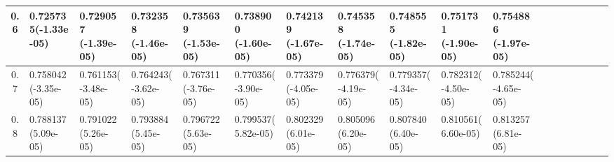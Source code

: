 \documentclass[
	article,			%
	12pt,				%
	twoside,			%
	a4paper,			%
	english,			%
	brazil,				%
	]{abntex2}
\begin{document}
\begin{landscape}
\begin{table}
\begin{tabular}{c||p{17mm}|p{17mm}|p{17mm}|p{17mm}|p{17mm}|p{17mm}|p{17mm}|p{17mm}|p{17mm}|p{17mm}|p{17mm}|p{17mm}|p{17mm}|p{17mm}|p{17mm}|p{17mm}|p{17mm}}
    			\hline\hline 
    			0.6 & 0.725735\newline(-1.33e-05) & 0.729057 \newline (-1.39e-05) & 0.732358 \newline (-1.46e-05) & 0.735639 \newline (-1.53e-05) & 0.738900 \newline (-1.60e-05) & 0.742139 \newline (-1.67e-05) & 0.745358 \newline (-1.74e-05) & 0.748555 \newline (-1.82e-05) & 0.751731 \newline (-1.90e-05) & 0.754886 \newline (-1.97e-05)\\
    			\hline 
    			0.7 & 0.758042\newline (-3.35e-05) & 0.761153\newline (-3.48e-05) & 0.764243\newline (-3.62e-05)& 0.767311 \newline (-3.76e-05)& 0.770356\newline (-3.90e-05)& 0.773379 \newline (-4.05e-05) & 0.776379\newline (-4.19e-05) &0.779357\newline (-4.34e-05)& 0.782312\newline(-4.50e-05)& 0.785244\newline(-4.65e-05)\\
    			\hline		
    			
    			0.8 & 0.788137\newline (5.09e-05) & 0.791022 \newline (5.26e-05) & 0.793884 \newline (5.45e-05) & 0.796722 \newline (5.63e-05) & 0.799537\newline (5.82e-05) & 0.802329 \newline (6.01e-05) & 0.805096 \newline(6.20e-05) & 0.807840 \newline (6.40e-05) & 0.810561\newline (6.60e-05)& 0.813257 \newline (6.81e-05)\\
    			
    			\hline
    	

\end{tabular}
\end{table}
\end{landscape}
\end{document}
